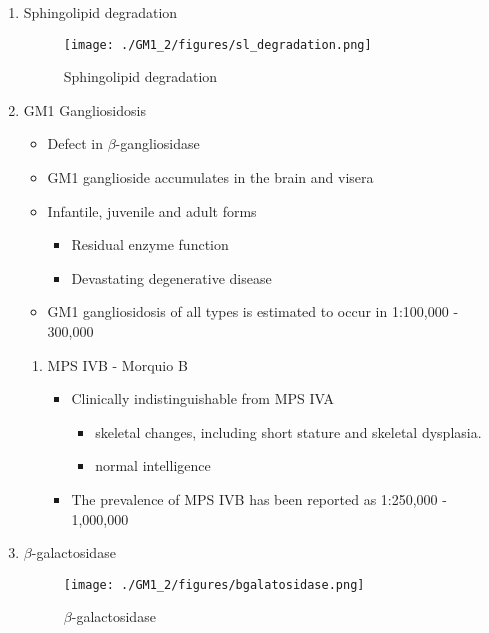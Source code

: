\documentclass{scrartcl}
\begin{document}
\begin{enumerate}
\item Sphingolipid degradation
\label{sec:org3819e1a}

\begin{figure}[htbp]
\centering
\texttt{[image: ./GM1\_2/figures/sl\_degradation.png]}
\caption{\label{fig:orgabd4641}
Sphingolipid degradation}
\end{figure}

\item GM1 Gangliosidosis
\label{sec:org8c86e62}
\begin{itemize}
\item Defect in \(\beta\)-gangliosidase
\item GM1 ganglioside accumulates in the brain and visera
\item Infantile, juvenile and adult forms
\begin{itemize}
\item Residual enzyme function
\item Devastating degenerative disease
\end{itemize}
\item GM1 gangliosidosis of all types is estimated to occur in 1:100,000 - 300,000
\end{itemize}

\begin{enumerate}
\item MPS IVB - Morquio B
\label{sec:orged2135a}
\begin{itemize}
\item Clinically indistinguishable from MPS IVA
\begin{itemize}
\item skeletal changes, including short stature and skeletal dysplasia.
\item normal intelligence
\end{itemize}
\item The prevalence of MPS IVB has been reported as 1:250,000 - 1,000,000
\end{itemize}
\end{enumerate}


\item \(\beta\)-galactosidase
\label{sec:org5912042}
\begin{figure}[htbp]
\centering
\texttt{[image: ./GM1\_2/figures/bgalatosidase.png]}
\caption{\label{fig:org5287606}
\(\beta\)-galactosidase}
\end{figure}



\end{enumerate}
\end{document}
